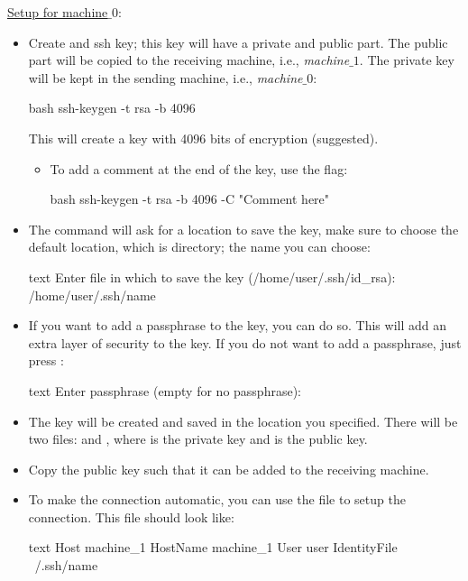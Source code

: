 \underline{\underline{Setup for machine$\_0$}}:

\begin{itemize}
    \item Create and ssh key; this key will have a private and public part. The public part will be
    copied to the receiving machine, i.e., \textit{machine$\_1$}. The private key will be kept in
    the sending machine, i.e., \textit{machine$\_0$}:
    \begin{mintedbox}{bash}
ssh-keygen -t rsa -b 4096
    \end{mintedbox}
    This will create a key with 4096 bits of encryption (suggested).
    \begin{itemize}
        \item To add a comment at the end of the key, use the  flag:
        \begin{mintedbox}{bash}
ssh-keygen -t rsa -b 4096 -C "Comment here"
        \end{mintedbox}
    \end{itemize}
    \item The command will ask for a location to save the key, make sure to choose the default
    location, which is  directory; the name you can choose:
    \begin{mintedbox}{text}
Enter file in which to save the key (/home/user/.ssh/id_rsa): /home/user/.ssh/name
    \end{mintedbox}
    \item If you want to add a passphrase to the key, you can do so. This will add an extra layer of
    security to the key. If you do not want to add a passphrase, just press :
    \begin{mintedbox}{text}
Enter passphrase (empty for no passphrase):
    \end{mintedbox}
    \item The key will be created and saved in the location you specified. There will be two files:
     and , where  is the private key
    and  is the public key.
    \item Copy the public key such that it can be added to the receiving
    machine.
    \item To make the connection automatic, you can use the file  to
    setup the connection. This file should look like:
    \begin{mintedbox}{text}
Host machine_1
    HostName machine_1
    User user
    IdentityFile ~/.ssh/name
    \end{mintedbox}
\end{itemize}

